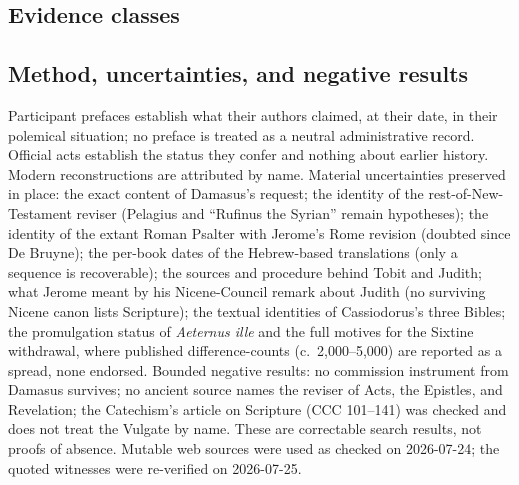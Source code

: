 \subsection{Evidence classes}

\begin{evidencekey}
\end{evidencekey}

\subsection{Method, uncertainties, and negative results}

Participant prefaces establish what their authors claimed, at their date,
in their polemical situation; no preface is treated as a neutral
administrative record. Official acts establish the status they confer and
nothing about earlier history. Modern reconstructions are attributed by
name. Material uncertainties preserved in place: the exact content of
Damasus's request; the identity of the rest-of-New-Testament reviser
(Pelagius and ``Rufinus the Syrian'' remain hypotheses); the identity of
the extant Roman Psalter with Jerome's Rome revision (doubted since De
Bruyne); the per-book dates of the Hebrew-based translations (only a
sequence is recoverable); the sources and procedure behind Tobit and
Judith; what Jerome meant by his Nicene-Council remark about Judith (no
surviving Nicene canon lists Scripture); the textual identities of
Cassiodorus's three Bibles; the promulgation status of \textit{Aeternus
ille} and the full motives for the Sixtine withdrawal, where published
difference-counts (c.~2,000--5,000) are reported as a spread, none
endorsed. Bounded negative results: no commission instrument from
Damasus survives; no ancient source names the reviser of Acts, the
Epistles, and Revelation; the Catechism's article on Scripture (CCC
101--141) was checked and does not treat the Vulgate by name. These are
correctable search results, not proofs of absence. Mutable web sources
were used as checked on 2026-07-24; the quoted witnesses were re-verified
on 2026-07-25.

